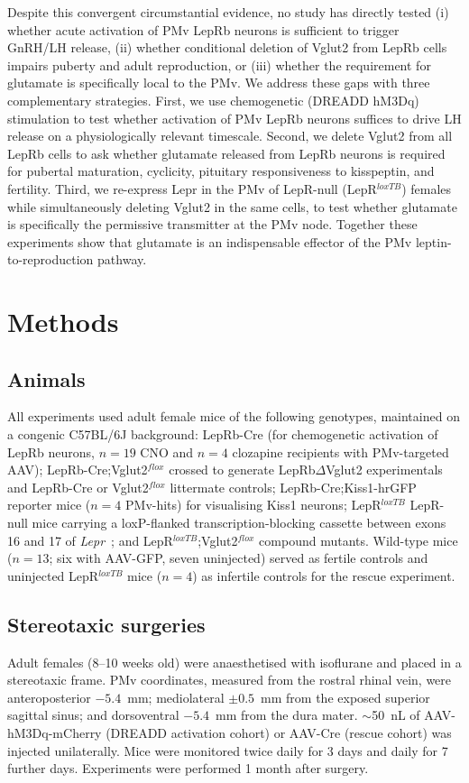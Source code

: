 \documentclass[11pt]{article}
\begin{document}
Despite this convergent circumstantial evidence, no study has directly tested (i) whether acute activation of PMv LepRb neurons is sufficient to trigger GnRH/LH release, (ii) whether conditional deletion of Vglut2 from LepRb cells impairs puberty and adult reproduction, or (iii) whether the requirement for glutamate is specifically local to the PMv. We address these gaps with three complementary strategies. First, we use chemogenetic (DREADD hM3Dq) stimulation to test whether activation of PMv LepRb neurons suffices to drive LH release on a physiologically relevant timescale. Second, we delete Vglut2 from all LepRb cells to ask whether glutamate released from LepRb neurons is required for pubertal maturation, cyclicity, pituitary responsiveness to kisspeptin, and fertility. Third, we re-express Lepr in the PMv of LepR-null (LepR$^{loxTB}$) females while simultaneously deleting Vglut2 in the same cells, to test whether glutamate is specifically the permissive transmitter at the PMv node. Together these experiments show that glutamate is an indispensable effector of the PMv leptin-to-reproduction pathway.

\section{Methods}

\subsection{Animals}
All experiments used adult female mice of the following genotypes, maintained on a congenic C57BL/6J background: LepRb-Cre (for chemogenetic activation of LepRb neurons, $n=19$ CNO and $n=4$ clozapine recipients with PMv-targeted AAV); LepRb-Cre;Vglut2$^{flox}$ crossed to generate LepRb$\Delta$Vglut2 experimentals and LepRb-Cre or Vglut2$^{flox}$ littermate controls; LepRb-Cre;Kiss1-hrGFP reporter mice ($n=4$ PMv-hits) for visualising Kiss1 neurons; LepR$^{loxTB}$ LepR-null mice carrying a loxP-flanked transcription-blocking cassette between exons 16 and 17 of \textit{Lepr}~\citep{berglund2012direct}; and LepR$^{loxTB}$;Vglut2$^{flox}$ compound mutants. Wild-type mice ($n=13$; six with AAV-GFP, seven uninjected) served as fertile controls and uninjected LepR$^{loxTB}$ mice ($n=4$) as infertile controls for the rescue experiment.

\subsection{Stereotaxic surgeries}
Adult females (8--10 weeks old) were anaesthetised with isoflurane and placed in a stereotaxic frame. PMv coordinates, measured from the rostral rhinal vein, were anteroposterior $-5.4$~mm; mediolateral $\pm0.5$~mm from the exposed superior sagittal sinus; and dorsoventral $-5.4$~mm from the dura mater. $\sim$50~nL of AAV-hM3Dq-mCherry (DREADD activation cohort) or AAV-Cre (rescue cohort) was injected unilaterally. Mice were monitored twice daily for 3 days and daily for 7 further days. Experiments were performed 1 month after surgery.
\end{document}
